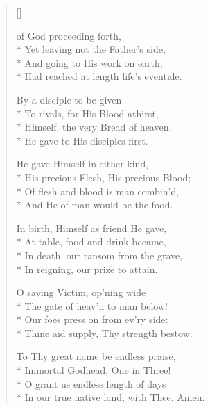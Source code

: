 \newHymn
{}
\label{hymn:OSavingVictim}

\begin{verse}[\versewidth]

 of God proceeding forth,\\*
Yet leaving not the Father's side,\\*   
And going to His work on earth,      \\* 
Had reached at length life's           
  eventide.                            
\pointorig

By a disciple to be given              \\*
To rivals, for His Blood athirst,      \\*
Himself, the very Bread of             
  heaven,                              \\*
He gave to His disciples first.        

He gave Himself in either kind,        \\*
His precious Flesh, His precious       
  Blood;                               \\*
Of flesh and blood is man combin'd,    \\*
And He of man would be the food.       

In birth, Himself as friend He gave,   \\*
At table, food and drink became,       \\*
In death, our ransom from the          
  grave,                               \\*
In reigning, our prize to attain.      


O saving Victim, op'ning wide          \\*
The gate of heav'n to man below!       \\*
Our foes press on from ev'ry side:     \\*
Thine aid supply, Thy strength         
  bestow.                              

To Thy great name be endless           
  praise,                              \\*
Immortal Godhead, One in Three!        \\*
O grant us endless length of days      \\*
In our true native land, with Thee.    
Amen.                     

\end{verse}

